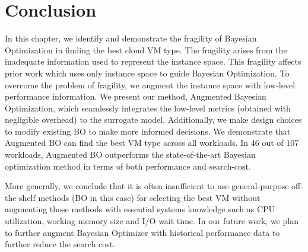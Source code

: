 \section{Conclusion}
\label{sec:conclusion}

In this chapter, we identify and demonstrate the fragility of Bayesian Optimization in finding the best cloud VM type.
The fragility arises from the inadequate information used to represent the instance space.
This fragility affects prior work which uses only instance space to guide Bayesian Optimization.
To overcome the problem of fragility, we augment the instance space with low-level performance information. 
We present our method, Augmented Bayesian Optimization, which seamlessly integrates the low-level metrics (obtained with negligible overhead) to the surrogate model.
Additionally, we make design choices to modify existing BO to make more informed decisions.
We demonstrate that Augmented BO can find the best VM type across all workloads. In 46 out of 107 workloads, Augmented BO outperforms the state-of-the-art Bayesian optimization method in terms of both performance and search-cost.  

More generally, we conclude that it is often insufficient to use general-purpose off-the-shelf methods (BO in this case) for selecting the best VM without augmenting those methods with essential systems knowledge such as CPU utilization, working memory size and I/O wait time.  In our future work, we plan to further augment Bayesian Optimizer with historical performance data to further reduce the search cost.

